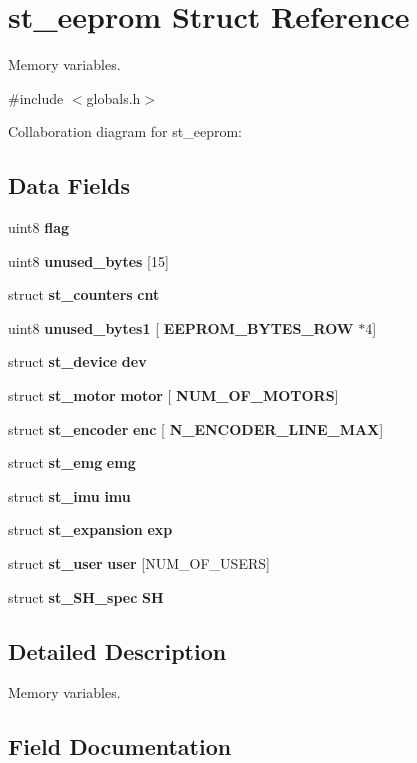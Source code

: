 \section{st\+\_\+eeprom Struct Reference}
\label{structst__eeprom}


Memory variables.  




{\ttfamily \#include $<$globals.\+h$>$}



Collaboration diagram for st\+\_\+eeprom\+:
\subsection*{Data Fields}
\begin{DoxyCompactItemize}
\item 
uint8 \textbf{ flag}
\item 
uint8 \textbf{ unused\+\_\+bytes} [15]
\item 
struct \textbf{ st\+\_\+counters} \textbf{ cnt}
\item 
uint8 \textbf{ unused\+\_\+bytes1} [\textbf{ E\+E\+P\+R\+O\+M\+\_\+\+B\+Y\+T\+E\+S\+\_\+\+R\+OW} $\ast$4]
\item 
struct \textbf{ st\+\_\+device} \textbf{ dev}
\item 
struct \textbf{ st\+\_\+motor} \textbf{ motor} [\textbf{ N\+U\+M\+\_\+\+O\+F\+\_\+\+M\+O\+T\+O\+RS}]
\item 
struct \textbf{ st\+\_\+encoder} \textbf{ enc} [\textbf{ N\+\_\+\+E\+N\+C\+O\+D\+E\+R\+\_\+\+L\+I\+N\+E\+\_\+\+M\+AX}]
\item 
struct \textbf{ st\+\_\+emg} \textbf{ emg}
\item 
struct \textbf{ st\+\_\+imu} \textbf{ imu}
\item 
struct \textbf{ st\+\_\+expansion} \textbf{ exp}
\item 
struct \textbf{ st\+\_\+user} \textbf{ user} [N\+U\+M\+\_\+\+O\+F\+\_\+\+U\+S\+E\+RS]
\item 
struct \textbf{ st\+\_\+\+S\+H\+\_\+spec} \textbf{ SH}
\end{DoxyCompactItemize}


\subsection{Detailed Description}
Memory variables. 



\subsection{Field Documentation}
\mbox{\label{structst__eeprom_a0ffc8a85c87e768e5f0f4682ad738f47}} 
